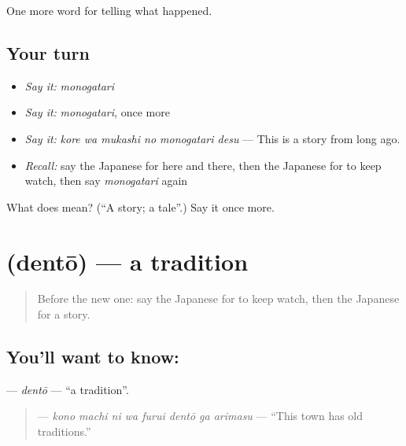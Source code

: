 \begin{grammarlens}[title={What you've built}]
One more word for telling what happened.
\end{grammarlens}

\subsection*{Your turn}
\begin{itemize}
\raggedright
  \item \emph{Say it:} \emph{monogatari}
  \item \emph{Say it:} \emph{monogatari}, once more
  \item \emph{Say it:} \emph{kore wa mukashi no monogatari desu} — This is a story from long ago.
  \item \emph{Recall:} say the Japanese for here and there, then the Japanese for to keep watch, then say \emph{monogatari} again
\end{itemize}

\begin{tcolorbox}[breakable,colback=teal!4,colframe=teal!35!black,title={Before you move on}]
What does  mean? (\textquotedblleft{}A story; a tale\textquotedblright{}.) Say it once more.
\end{tcolorbox}
\section[\texorpdfstring{\ja{でんとう} (dentō)}{でんとう (dentō)}]{ (dentō) — a tradition}

\label{lesson:JA-C316-dentou}



\begin{quote}
Before the new one: say the Japanese for to keep watch, then the Japanese for a story.
\end{quote}

\subsection*{You'll want to know: }
\textbf{} — \emph{dentō} — \textquotedblleft{}a tradition\textquotedblright{}.

\begin{quote}
\textbf{    } — \emph{kono machi ni wa furui dentō ga arimasu} — \textquotedblleft{}This town has old traditions.\textquotedblright{}
\end{quote}


